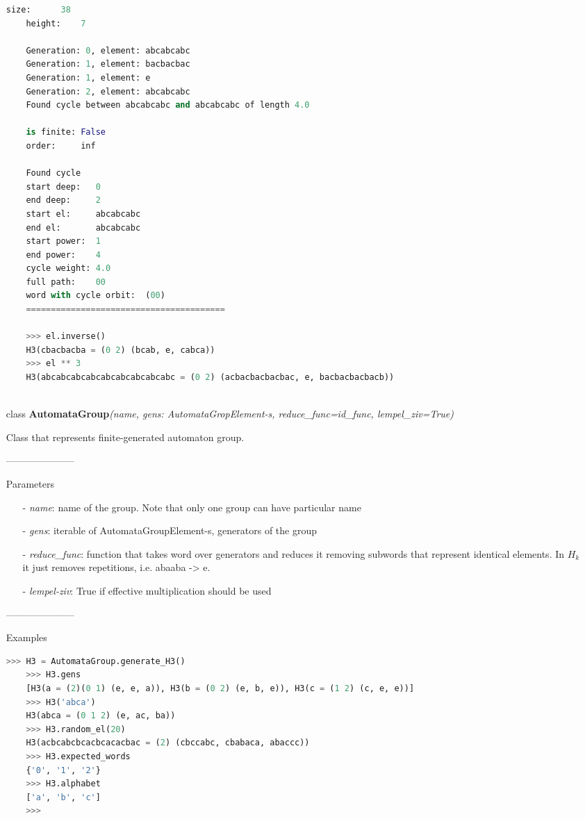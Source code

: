 \documentclass[a4paper,12pt]{amsart}
\begin{document}
\begin{itemize}
\begin{lstlisting}[language=python]
	size:      38
	height:    7
	
	Generation: 0, element: abcabcabc
	Generation: 1, element: bacbacbac
	Generation: 1, element: e
	Generation: 2, element: abcabcabc
	Found cycle between abcabcabc and abcabcabc of length 4.0
	
	is finite: False
	order:     inf
	
	Found cycle
	start deep:   0
	end deep:     2
	start el:     abcabcabc
	end el:       abcabcabc
	start power:  1
	end power:    4
	cycle weight: 4.0
	full path:    00
	word with cycle orbit:  (00)
	========================================
	
	>>> el.inverse()
	H3(cbacbacba = (0 2) (bcab, e, cabca))
	>>> el ** 3
	H3(abcabcabcabcabcabcabcabcabc = (0 2) (acbacbacbacbac, e, bacbacbacbacb))
	
	\end{lstlisting}
	
	
	\item[class] \textbf{AutomataGroup}\textit{(name, gens: AutomataGropElement-s, reduce\_func=id\_func, lempel\_ziv=True)}
	
	Class that represents finite-generated automaton group. 
	
	---------------------
	
	Parameters 
	
	\begin{itemize}
		\item[-] \textit{name}: name of the group. Note that only one group can have particular name
		
		\item[-] \textit{gens}: iterable of AutomataGroupElement-s, generators of the group
		
		\item[-] \textit{reduce\_func}: function that takes word over generators and reduces it removing subwords that represent identical elements. In $H_k$ it just removes repetitions, i.e. abaaba -> e.
		
		\item[-] \textit{lempel-ziv}: True if effective multiplication should be used
	\end{itemize}
	
	---------------------
	
	Examples 
	
	\begin{lstlisting}[language=python]
	>>> H3 = AutomataGroup.generate_H3()
	>>> H3.gens
	[H3(a = (2)(0 1) (e, e, a)), H3(b = (0 2) (e, b, e)), H3(c = (1 2) (c, e, e))]
	>>> H3('abca')
	H3(abca = (0 1 2) (e, ac, ba))
	>>> H3.random_el(20)
	H3(acbcabcbcacbcacacbac = (2) (cbccabc, cbabaca, abaccc))
	>>> H3.expected_words
	{'0', '1', '2'}
	>>> H3.alphabet
	['a', 'b', 'c']
	>>> 
	\end{lstlisting}
	
\end{itemize}
\end{document}
